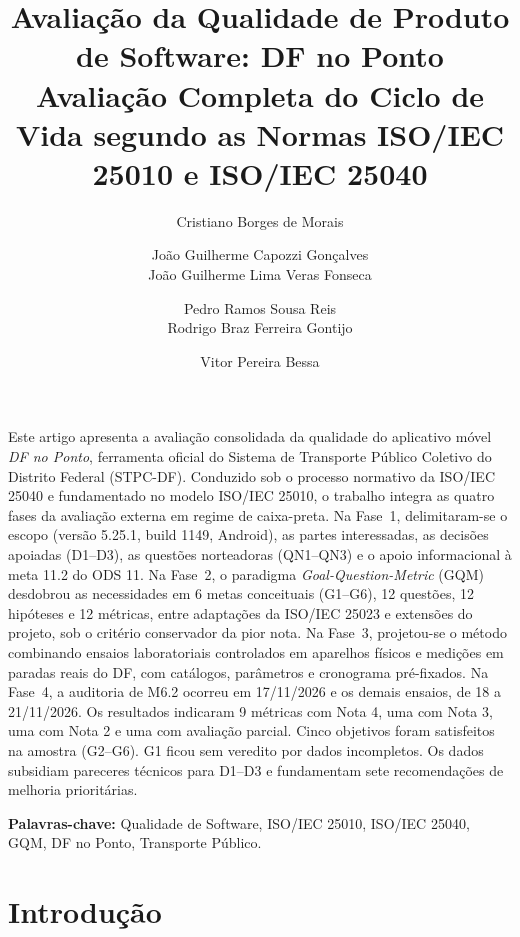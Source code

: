 \documentclass[11pt,a4paper]{article}
\title{\textbf{Avaliação da Qualidade de Produto de Software: DF no Ponto}\\
       \vspace{0.2em}
       {\large \textbf{Avaliação Completa do Ciclo de Vida segundo as Normas ISO/IEC 25010 e ISO/IEC 25040}}}
\author{Cristiano Borges de Morais \and João Guilherme Capozzi Gonçalves \\
        João Guilherme Lima Veras Fonseca \and Pedro Ramos Sousa Reis \\
        Rodrigo Braz Ferreira Gontijo \and Vitor Pereira Bessa}
\begin{document}
\maketitle

\begin{resumo}
Este artigo apresenta a avaliação consolidada da qualidade do aplicativo móvel \textit{DF no Ponto}, ferramenta oficial do Sistema de Transporte Público Coletivo do Distrito Federal (STPC-DF). Conduzido sob o processo normativo da ISO/IEC 25040 e fundamentado no modelo ISO/IEC 25010, o trabalho integra as quatro fases da avaliação externa em regime de caixa-preta. Na Fase~1, delimitaram-se o escopo (versão 5.25.1, build 1149, Android), as partes interessadas, as decisões apoiadas (D1--D3), as questões norteadoras (QN1--QN3) e o apoio informacional à meta 11.2 do ODS 11. Na Fase~2, o paradigma \textit{Goal-Question-Metric} (GQM) desdobrou as necessidades em 6 metas conceituais (G1--G6), 12 questões, 12 hipóteses e 12 métricas, entre adaptações da ISO/IEC 25023 e extensões do projeto, sob o critério conservador da pior nota. Na Fase~3, projetou-se o método combinando ensaios laboratoriais controlados em aparelhos físicos e medições em paradas reais do DF, com catálogos, parâmetros e cronograma pré-fixados. Na Fase~4, a auditoria de M6.2 ocorreu em 17/11/2026 e os demais ensaios, de 18 a 21/11/2026. Os resultados indicaram 9 métricas com Nota 4, uma com Nota 3, uma com Nota 2 e uma com avaliação parcial. Cinco objetivos foram satisfeitos na amostra (G2--G6). G1 ficou sem veredito por dados incompletos. Os dados subsidiam pareceres técnicos para D1--D3 e fundamentam sete recomendações de melhoria prioritárias.
\end{resumo}

\vspace{0.2em}
\noindent \textbf{Palavras-chave:} Qualidade de Software, ISO/IEC 25010, ISO/IEC 25040, GQM, DF no Ponto, Transporte Público.

\section{Introdução}
\label{sec:intro}
\end{document}
